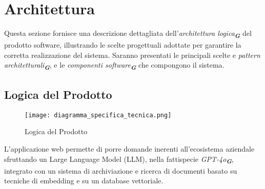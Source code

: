 
\section{Architettura}
\label{sec:architettura}

Questa sezione fornisce una descrizione dettagliata dell'\emph{architettura logica}\textsubscript{\textbf{\textit{G}}} del prodotto software, illustrando le scelte progettuali adottate per garantire la corretta realizzazione del sistema. Saranno presentati le principali scelte e \emph{pattern architetturali}\textsubscript{\textbf{\textit{G}}}, e le \emph{componenti software}\textsubscript{\textbf{\textit{G}}} che compongono il sistema.

\subsection{Logica del Prodotto}
\label{sec:logica_prodotto}

\begin{figure}[h]
    \centering
    \texttt{[image: diagramma\_specifica\_tecnica.png]}
    \caption{Logica del Prodotto}
\end{figure}

L’applicazione web permette di porre domande inerenti all’ecosistema aziendale
sfruttando un Large Language Model (LLM), nella fattispecie \emph{GPT-4o}\textsubscript{\textbf{\textit{G}}}, integrato con
un sistema di archiviazione e ricerca di documenti basato su tecniche di embedding
e su un database vettoriale.

